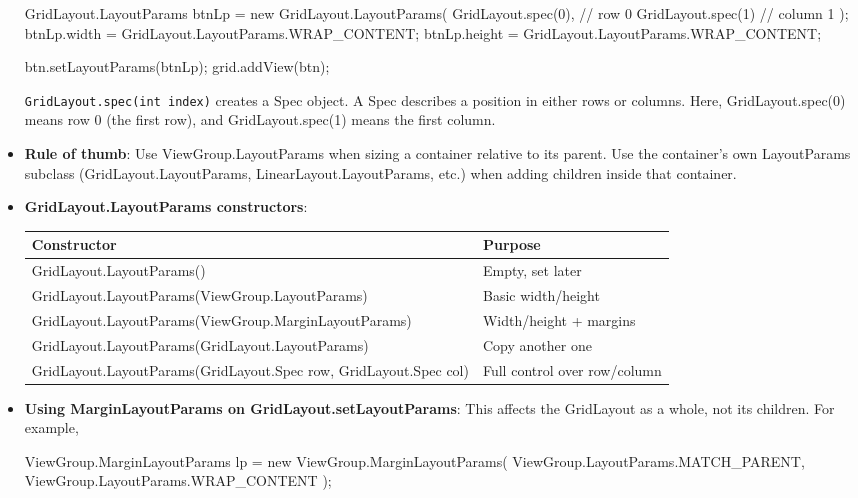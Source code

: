 \documentclass{report}
\begin{document}
\begin{itemize}
\begin{javacode}
                GridLayout.LayoutParams btnLp = new GridLayout.LayoutParams(
                        GridLayout.spec(0),  // row 0
                        GridLayout.spec(1)   // column 1
                );
                btnLp.width = GridLayout.LayoutParams.WRAP_CONTENT;
                btnLp.height = GridLayout.LayoutParams.WRAP_CONTENT;

                btn.setLayoutParams(btnLp);
                grid.addView(btn);
            \end{javacode}
            \bigbreak \noindent 
            \texttt{GridLayout.spec(int index)} creates a Spec object. A Spec describes a position in either rows or columns. Here, GridLayout.spec(0) means row 0 (the first row), and GridLayout.spec(1) means the first column.
        \item \textbf{Rule of thumb}: 
            Use ViewGroup.LayoutParams when sizing a container relative to its parent.
            \bigbreak \noindent 
            Use the container’s own LayoutParams subclass (GridLayout.LayoutParams, LinearLayout.LayoutParams, etc.) when adding children inside that container.
        \item \textbf{GridLayout.LayoutParams constructors}:
            \begin{center}
                \begin{tabular}{p{8cm}|p{4cm}}
                    Constructor	&Purpose \\
                    \hline
                    GridLayout.LayoutParams()	&Empty, set later \\
                    GridLayout.LayoutParams(ViewGroup.LayoutParams)	&Basic width/height \\
                    GridLayout.LayoutParams(ViewGroup.MarginLayoutParams)	&Width/height + margins \\
                    GridLayout.LayoutParams(GridLayout.LayoutParams)	&Copy another one\\
                    GridLayout.LayoutParams(GridLayout.Spec row, GridLayout.Spec col)	&Full control over row/column
                \end{tabular}
            \end{center}
        \item \textbf{Using MarginLayoutParams on GridLayout.setLayoutParams}: This affects the GridLayout as a whole, not its children.
            \bigbreak \noindent 
            For example, 
            \bigbreak \noindent 
            \begin{javacode}
                ViewGroup.MarginLayoutParams lp =
                new ViewGroup.MarginLayoutParams(
                    ViewGroup.LayoutParams.MATCH_PARENT,
                    ViewGroup.LayoutParams.WRAP_CONTENT
                );


\end{javacode}
\end{itemize}
\end{document}
